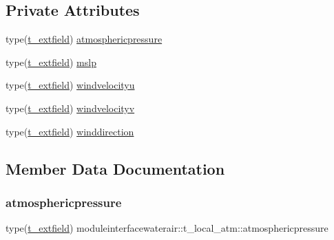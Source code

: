 \subsection*{Private Attributes}
\begin{DoxyCompactItemize}
\item 
type(\mbox{\hyperlink{structmoduleinterfacewaterair_1_1t__extfield}{t\+\_\+extfield}}) \mbox{\hyperlink{structmoduleinterfacewaterair_1_1t__local__atm_a3be35284c5c235bf6277017d684bb239}{atmosphericpressure}}
\item 
type(\mbox{\hyperlink{structmoduleinterfacewaterair_1_1t__extfield}{t\+\_\+extfield}}) \mbox{\hyperlink{structmoduleinterfacewaterair_1_1t__local__atm_ae3a242866e7601868c5556e4db272168}{mslp}}
\item 
type(\mbox{\hyperlink{structmoduleinterfacewaterair_1_1t__extfield}{t\+\_\+extfield}}) \mbox{\hyperlink{structmoduleinterfacewaterair_1_1t__local__atm_ace20efb1de4759780b6dce8fab6163d5}{windvelocityu}}
\item 
type(\mbox{\hyperlink{structmoduleinterfacewaterair_1_1t__extfield}{t\+\_\+extfield}}) \mbox{\hyperlink{structmoduleinterfacewaterair_1_1t__local__atm_a8cb9729f6da6ed9861f9e4d4f26024f9}{windvelocityv}}
\item 
type(\mbox{\hyperlink{structmoduleinterfacewaterair_1_1t__extfield}{t\+\_\+extfield}}) \mbox{\hyperlink{structmoduleinterfacewaterair_1_1t__local__atm_afbddccc660d49b74a469d6faa48a5987}{winddirection}}
\end{DoxyCompactItemize}


\subsection{Member Data Documentation}
\mbox{\label{structmoduleinterfacewaterair_1_1t__local__atm_a3be35284c5c235bf6277017d684bb239}} 
\subsubsection{\texorpdfstring{atmosphericpressure}{atmosphericpressure}}
{\footnotesize\ttfamily type(\mbox{\hyperlink{structmoduleinterfacewaterair_1_1t__extfield}{t\+\_\+extfield}}) moduleinterfacewaterair\+::t\+\_\+local\+\_\+atm\+::atmosphericpressure\hspace{0.3cm}{\ttfamily [private]}}

